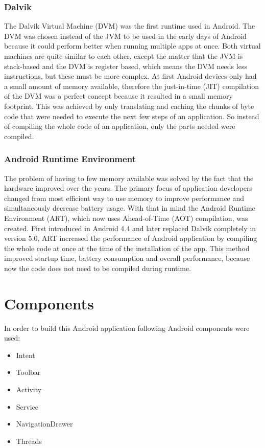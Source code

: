 \subsubsection{Dalvik}
The Dalvik Virtual Machine (DVM) was the first runtime used in Android. The DVM was chosen instead of the JVM to be used in the early days of Android because it could perform better when running multiple apps at once. Both virtual machines are quite similar to each other, except the matter that the JVM is stack-based and the DVM is register based, which means the DVM needs less instructions, but these must be more complex. At first Android devices only had a small amount of memory available, therefore the just-in-time (JIT) compilation of the DVM was a perfect concept because it resulted in a small memory footprint. This was achieved by only translating and caching the chunks of byte code that were needed to execute the next few steps of an application. So instead of compiling the whole code of an application, only the parts needed were compiled.

\subsubsection{Android Runtime Environment}
The problem of having to few memory available was solved by the fact that the hardware improved over the years. The primary focus of application developers changed from most efficient way to use memory to improve performance and simultaneously decrease battery usage. With that in mind the Android Runtime Environment (ART), which now uses Ahead-of-Time (AOT) compilation, was created. First introduced in Android 4.4 and later replaced Dalvik completely in version 5.0, ART increased the performance of Android application by compiling the whole code at once at the time of the installation of the app. This method improved startup time, battery consumption and overall performance, because now the code does not need to be compiled during runtime.

\section{Components}
In order to build this Android application following Android components were used:

\begin{itemize}
    \item Intent
    \item Toolbar
    \item Activity
    \item Service
    \item NavigationDrawer
    \item Threads
\end{itemize}

